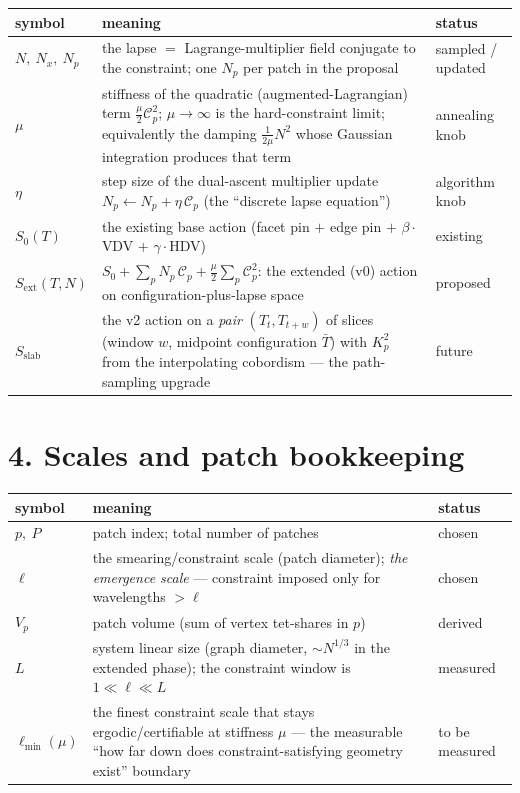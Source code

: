 \documentclass[11pt]{article}
\newcommand{\C}{\mathcal{C}}
\begin{document}
\begin{tabularx}{\textwidth}{@{}l L l@{}}
\toprule
symbol & meaning & status \\
\midrule
$N,\ N_x,\ N_p$ & the lapse $=$ Lagrange-multiplier field conjugate to the constraint; one $N_p$ per patch in the proposal & sampled / updated \\
$\mu$ & stiffness of the quadratic (augmented-Lagrangian) term $\tfrac{\mu}{2}\C_p^2$; $\mu\to\infty$ is the hard-constraint limit; equivalently the damping $\tfrac{1}{2\mu}N^2$ whose Gaussian integration produces that term & annealing knob \\
$\eta$ & step size of the dual-ascent multiplier update $N_p \leftarrow N_p + \eta\,\C_p$ (the ``discrete lapse equation'') & algorithm knob \\
$S_0(T)$ & the existing base action (facet pin $+$ edge pin $+$ $\beta\cdot$VDV $+$ $\gamma\cdot$HDV) & existing \\
$S_{\mathrm{ext}}(T,N)$ & $S_0 + \sum_p N_p\,\C_p + \tfrac{\mu}{2}\sum_p \C_p^2$: the extended (v0) action on configuration-plus-lapse space & proposed \\
$S_{\mathrm{slab}}$ & the v2 action on a \emph{pair} $(T_t, T_{t+w})$ of slices (window $w$, midpoint configuration $\bar T$) with $K_p^2$ from the interpolating cobordism --- the path-sampling upgrade & future \\
\bottomrule
\end{tabularx}

\section*{4. Scales and patch bookkeeping}

\begin{tabularx}{\textwidth}{@{}l L l@{}}
\toprule
symbol & meaning & status \\
\midrule
$p,\ P$ & patch index; total number of patches & chosen \\
$\ell$ & the smearing/constraint scale (patch diameter); \emph{the emergence scale} --- constraint imposed only for wavelengths $>\ell$ & chosen \\
$V_p$ & patch volume (sum of vertex tet-shares in $p$) & derived \\
$L$ & system linear size (graph diameter, $\sim N^{1/3}$ in the extended phase); the constraint window is $1 \ll \ell \ll L$ & measured \\
$\ell_{\min}(\mu)$ & the finest constraint scale that stays ergodic/certifiable at stiffness $\mu$ --- the measurable ``how far down does constraint-satisfying geometry exist'' boundary & to be measured \\
\bottomrule
\end{tabularx}
\end{document}
